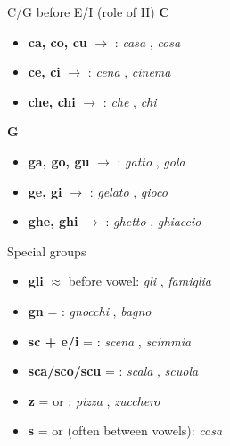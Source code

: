 \blueheader
\begin{frame}{C/G before E/I (role of H)}
\textbf{C}
\begin{itemize}
  \item \textbf{ca, co, cu} $\to$ \textipa{[k]}: \textit{casa} \textipa{["ka:za]}, \textit{cosa} \textipa{["kOza]}
  \item \textbf{ce, ci} $\to$ \textipa{[tS]}: \textit{cena} \textipa{["tSe:na]}, \textit{cinema} \textipa{["tSinema]}
  \item \textbf{che, chi} $\to$ \textipa{[k]}: \textit{che} \textipa{[ke]}, \textit{chi} \textipa{[ki]}
\end{itemize}

\textbf{G}
\begin{itemize}
  \item \textbf{ga, go, gu} $\to$ \textipa{[g]}: \textit{gatto} \textipa{["gat:o]}, \textit{gola} \textipa{["gOla]}
  \item \textbf{ge, gi} $\to$ \textipa{[dZ]}: \textit{gelato} , \textit{gioco} \textipa{["dZOko]}
  \item \textbf{ghe, ghi} $\to$ \textipa{[g]}: \textit{ghetto} \textipa{["getto]}, \textit{ghiaccio} \textipa{["gjattSo]}
\end{itemize}
\end{frame}

\redheader
\begin{frame}{Special groups}
\begin{itemize}
  \item \textbf{gli} $\approx$ \textipa{[L]} before vowel: \textit{gli} \textipa{[Li]}, \textit{famiglia} \textipa{[fa"miLa]}
  \item \textbf{gn} = \textipa{[J]}: \textit{gnocchi} \textipa{["JOkki]}, \textit{bagno} \textipa{["baJo]}
  \item \textbf{sc + e/i} = \textipa{[S]}: \textit{scena} \textipa{["Se:na]}, \textit{scimmia} \textipa{["Sim:a]}
  \item \textbf{sca/sco/scu} = \textipa{[sk]}: \textit{scala} \textipa{["skala]}, \textit{scuola} \textipa{["skwOla]}
  \item \textbf{z} = \textipa{[ts]} or \textipa{[dz]}: \textit{pizza} \textipa{["pittsa]}, \textit{zucchero} \textipa{["dzukkero]}
  \item \textbf{s} = \textipa{[s]} or \textipa{[z]} (often \textipa{[z]} between vowels): \textit{casa} \textipa{["ka:za]}
\end{itemize}
\end{frame}

